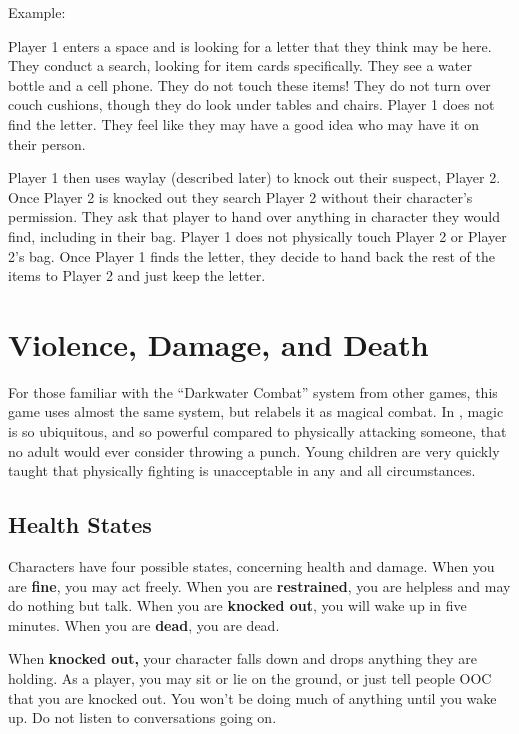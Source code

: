 \documentclass[sheet]{GL2020}
\begin{document}
Example:

Player 1 enters a space and is looking for a letter that they think may be here. They conduct a search, looking for item cards specifically. They see a water bottle and a cell phone. They do not touch these items! They do not turn over couch cushions, though they do look under tables and chairs.  Player 1 does not find the letter. They feel like they may have a good idea who may have it on their person.

Player 1 then uses waylay (described later) to knock out their suspect, Player 2. Once Player 2 is knocked out they search Player 2 without their character’s permission. They ask that player to hand over anything in character they would find, including in their bag. Player 1 does not physically touch Player 2 or Player 2’s bag. Once Player 1 finds the letter, they decide to hand back the rest of the items to Player 2 and just keep the letter.

\section{Violence, Damage, and Death}
For those familiar with the ``Darkwater Combat'' system from other games, this game uses almost the same system, but relabels it as magical combat. In \pEarth{}, magic is so ubiquitous, and so powerful compared to physically attacking someone, that no adult would ever consider throwing a punch. Young children are very quickly taught that physically fighting is unacceptable in any and all circumstances.

\subsection{Health States}

Characters have four possible states, concerning health and damage. When you are {\bf fine}, you may act freely. When you are {\bf restrained}, you are helpless and may do nothing but talk.  When you are {\bf knocked out}, you will wake up in five minutes. When you are {\bf dead}, you are dead.

When \textbf{knocked out,} your character falls down and drops anything they are holding. As a player, you may sit or lie on the ground, or just tell people OOC that you are knocked out. You won't be doing much of anything until you wake up. Do not listen to conversations going on. 
\end{document}
